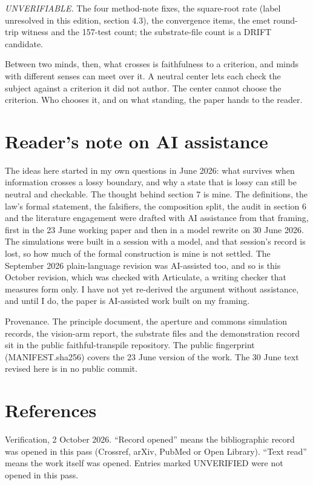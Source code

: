 \documentclass[11pt]{article}
\begin{document}
\emph{UNVERIFIABLE.} The four method-note fixes, the square-root rate (label unresolved in this edition, section 4.3), the convergence items, the emet round-trip witness and the 157-test count; the substrate-file count is a DRIFT candidate.

Between two minds, then, what crosses is faithfulness to a criterion, and minds with different senses can meet over it. A neutral center lets each check the subject against a criterion it did not author. The center cannot choose the criterion. Who chooses it, and on what standing, the paper hands to the reader.

\section*{Reader's note on AI assistance}

The ideas here started in my own questions in June 2026: what survives when information crosses a lossy boundary, and why a state that is lossy can still be neutral and checkable. The thought behind section 7 is mine. The definitions, the law's formal statement, the falsifiers, the composition split, the audit in section 6 and the literature engagement were drafted with AI assistance from that framing, first in the 23 June working paper and then in a model rewrite on 30 June 2026. The simulations were built in a session with a model, and that session's record is lost, so how much of the formal construction is mine is not settled. The September 2026 plain-language revision was AI-assisted too, and so is this October revision, which was checked with Articulate, a writing checker that measures form only. I have not yet re-derived the argument without assistance, and until I do, the paper is AI-assisted work built on my framing.

Provenance. The principle document, the aperture and commons simulation records, the vision-arm report, the substrate files and the demonstration record sit in the public faithful-transpile repository. The public fingerprint (MANIFEST.sha256) covers the 23 June version of the work. The 30 June text revised here is in no public commit.

\section*{References}

Verification, 2 October 2026. ``Record opened'' means the bibliographic record was opened in this pass (Crossref, arXiv, PubMed or Open Library). ``Text read'' means the work itself was opened. Entries marked UNVERIFIED were not opened in this pass.
\end{document}
